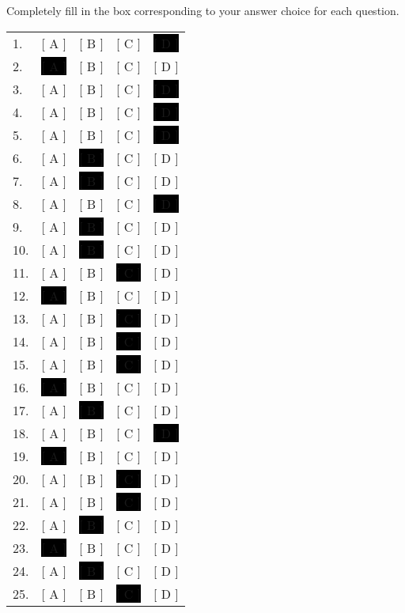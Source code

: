 \documentclass[10pt,a4paper]{exam}
\begin{document}
Completely fill in the box corresponding to your answer choice for each question.

\ifprintanswers
\begin{tabular}{lcccc}\\
  1. & [ A ] & [ B ] & [ C ] & \colorbox{black}{[ D ]} \\
  2. & \colorbox{black}{[ A ]} & [ B ] & [ C ] & [ D ] \\
  3. & [ A ] & [ B ] & [ C ] & \colorbox{black}{[ D ]} \\
  4. & [ A ] & [ B ] & [ C ] & \colorbox{black}{[ D ]} \\
  5. & [ A ] & [ B ] & [ C ] & \colorbox{black}{[ D ]} \\
  6. & [ A ] & \colorbox{black}{[ B ]} & [ C ] & [ D ] \\
  7. & [ A ] & \colorbox{black}{[ B ]} & [ C ] & [ D ] \\
  8. & [ A ] & [ B ] & [ C ] & \colorbox{black}{[ D ]} \\
  9. & [ A ] & \colorbox{black}{[ B ]} & [ C ] & [ D ] \\
  10. & [ A ] & \colorbox{black}{[ B ]} & [ C ] & [ D ] \\
  11. & [ A ] & [ B ] & \colorbox{black}{[ C ]} & [ D ] \\
  12. & \colorbox{black}{[ A ]} & [ B ] & [ C ] & [ D ] \\
  13. & [ A ] & [ B ] & \colorbox{black}{[ C ]} & [ D ] \\
  14. & [ A ] & [ B ] & \colorbox{black}{[ C ]} & [ D ] \\
  15. & [ A ] & [ B ] & \colorbox{black}{[ C ]} & [ D ] \\
  16. & \colorbox{black}{[ A ]} & [ B ] & [ C ] & [ D ] \\
  17. & [ A ] & \colorbox{black}{[ B ]} & [ C ] & [ D ] \\
  18. & [ A ] & [ B ] & [ C ] & \colorbox{black}{[ D ]} \\
  19. & \colorbox{black}{[ A ]} & [ B ] & [ C ] & [ D ] \\
  20. & [ A ] & [ B ] & \colorbox{black}{[ C ]} & [ D ] \\
  21. & [ A ] & [ B ] & \colorbox{black}{[ C ]} & [ D ] \\
  22. & [ A ] & \colorbox{black}{[ B ]} & [ C ] & [ D ] \\
  23. & \colorbox{black}{[ A ]} & [ B ] & [ C ] & [ D ] \\
  24. & [ A ] & \colorbox{black}{[ B ]} & [ C ] & [ D ] \\
  25. & [ A ] & [ B ] & \colorbox{black}{[ C ]} & [ D ] \\
\end{tabular}
\end{document}
